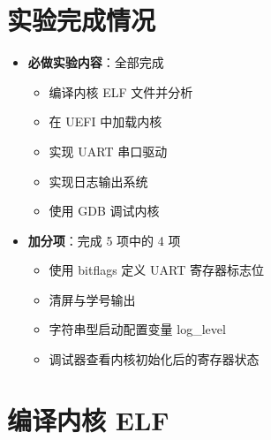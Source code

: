 \documentclass{SYSUReport}
\date{\today}
\begin{document}
\cover
{}
\thispagestyle{empty} %
\clearpage

\clearpage

\setcounter{page}{1}

\section{实验完成情况}

\begin{itemize}
    \item \textbf{必做实验内容}：全部完成
    \begin{itemize}
        \item 编译内核 ELF 文件并分析
        \item 在 UEFI 中加载内核
        \item 实现 UART 串口驱动
        \item 实现日志输出系统
        \item 使用 GDB 调试内核
    \end{itemize}
    \item \textbf{加分项}：完成 5 项中的 4 项
    \begin{itemize}
        \item 使用 bitflags 定义 UART 寄存器标志位
        \item 清屏与学号输出
        \item 字符串型启动配置变量 log\_level
        \item 调试器查看内核初始化后的寄存器状态
    \end{itemize}
\end{itemize}

\section{编译内核 ELF}
\end{document}
